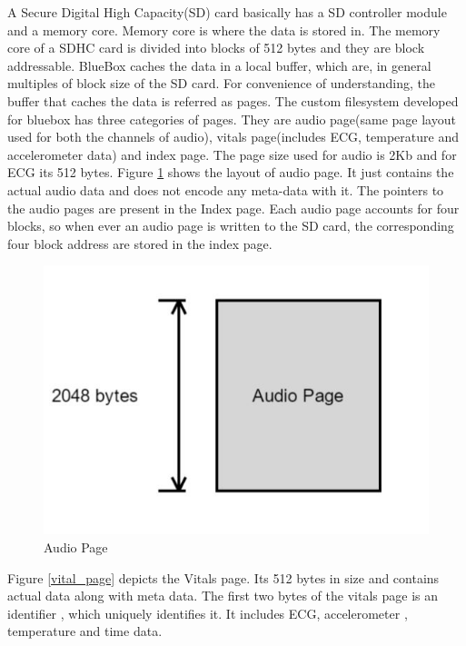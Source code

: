  

A Secure Digital High Capacity(SD) card basically has a SD controller module and a memory core. Memory core is where the data is stored in. The memory core of a SDHC card is divided into blocks of 512 bytes and they are block addressable.  BlueBox caches the data in a local buffer, which  are, in general multiples of block size of the SD card. For convenience of understanding, the buffer that caches the data is referred as pages. The custom filesystem developed for bluebox has three categories of pages. They are audio page(same page layout used for both the channels of audio), vitals page(includes ECG, temperature and accelerometer data) and index page. The page size used for audio is 2Kb and for ECG its 512 bytes.
 Figure \ref{audio_page} shows the layout of audio page. It just contains the actual audio data and does not encode any meta-data with it. The pointers to the audio pages are present in the Index page. Each audio page accounts for four blocks, so when ever an audio page is written to the SD card, the corresponding four block address are stored in the index page. 
\begin{figure}[h]
	\centering
	\hspace*{-2cm} 
	\includegraphics[scale = 0.5 ]{audio_page.JPG}
	\caption{Audio Page\label{audio_page}}
\end{figure}


 Figure \ref{vital_page} depicts the Vitals page. Its 512 bytes in size and contains actual data along with meta data. The first two bytes of the vitals page is an identifier , which uniquely identifies it. It includes ECG, accelerometer , temperature and time data. 

